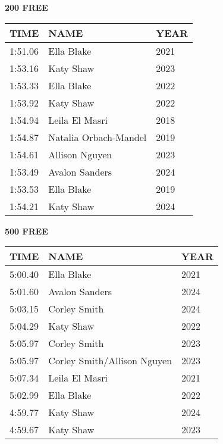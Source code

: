 \begin{minipage}[t]{0.48\textwidth}
\centering
\textbf{200 FREE}\\[0.05cm]
\begin{tabular}{@{}p{1.8cm}p{2.8cm}p{1.2cm}@{}}
\hline
\textbf{TIME} & \textbf{NAME} & \textbf{YEAR} \\
\hline
1:51.06 & Ella Blake & 2021 \\
1:53.16 & Katy Shaw & 2023 \\
1:53.33 & Ella Blake & 2022 \\
1:53.92 & Katy Shaw & 2022 \\
1:54.94 & Leila El Masri & 2018 \\
1:54.87 & Natalia Orbach-Mandel & 2019 \\
1:54.61 & Allison Nguyen & 2023 \\
1:53.49 & Avalon Sanders & 2024 \\
1:53.53 & Ella Blake & 2019 \\
1:54.21 & Katy Shaw & 2024 \\
\hline
\end{tabular}
\end{minipage}\hfill
\begin{minipage}[t]{0.48\textwidth}
\centering
\textbf{500 FREE}\\[0.05cm]
\begin{tabular}{@{}p{1.8cm}p{2.8cm}p{1.2cm}@{}}
\hline
\textbf{TIME} & \textbf{NAME} & \textbf{YEAR} \\
\hline
5:00.40 & Ella Blake & 2021 \\
5:01.60 & Avalon Sanders & 2024 \\
5:03.15 & Corley Smith & 2024 \\
5:04.29 & Katy Shaw & 2022 \\
5:05.97 & Corley Smith & 2023 \\
5:05.97 & Corley Smith/Allison Nguyen & 2023 \\
5:07.34 & Leila El Masri & 2021 \\
5:02.99 & Ella Blake & 2022 \\
4:59.77 & Katy Shaw & 2024 \\
4:59.67 & Katy Shaw & 2023 \\
\hline
\end{tabular}
\end{minipage}

\vspace{0.4cm}

